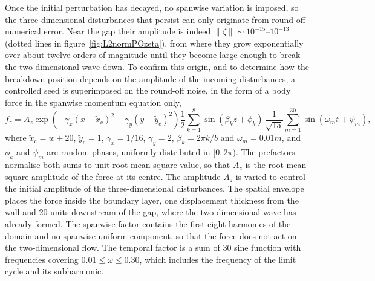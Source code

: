 \documentclass[lineno]{jfm}
\begin{document}
Once the initial perturbation has decayed, no spanwise variation is imposed, so the three-dimensional disturbances that persist can only originate from round-off numerical error. Near the gap their amplitude is indeed $\|\zeta\|\sim10^{-15}$--$10^{-13}$ (dotted lines in figure~\ref{fig:L2normPOzeta}), from where they grow exponentially over about twelve orders of magnitude until they become large enough to break the two-dimensional wave down. To confirm this origin, and to determine how the breakdown position depends on the amplitude of the incoming disturbances, a controlled seed is superimposed on the round-off noise, in the form of a body force in the spanwise momentum equation only,
\begin{equation}\label{eq:seedForcing}
	f_z = A_z\exp{\left(-\gamma_x{(x-\tilde{x}_\mathrm{c})}^2-\gamma_y{(y-\tilde{y}_\mathrm{c})}^2\right)}\frac{1}{2}\sum_{k=1}^{8}\sin(\beta_k z+\phi_k)\,\frac{1}{\sqrt{15}}\sum_{m=1}^{30}\sin(\omega_m t+\psi_m),
\end{equation}
where $\tilde{x}_\mathrm{c}=w+20$, $\tilde{y}_\mathrm{c}=1$, $\gamma_x=1/16$, $\gamma_y=2$, $\beta_k=2\pi k/b$ and $\omega_m=0.01m$, and $\phi_k$ and $\psi_m$ are random phases, uniformly distributed in $[0,2\pi)$. The prefactors normalise both sums to unit root-mean-square value, so that $A_z$ is the root-mean-square amplitude of the force at its centre. The amplitude $A_z$ is varied to control the initial amplitude of the three-dimensional disturbances. The spatial envelope places the force inside the boundary layer, one displacement thickness from the wall and $20$ units downstream of the gap, where the two-dimensional wave has already formed. The spanwise factor contains the first eight harmonics of the domain and no spanwise-uniform component, so that the force does not act on the two-dimensional flow. The temporal factor is a sum of $30$ sine function with frequencies covering $0.01\leq\omega\leq0.30$, which includes the frequency of the limit cycle and its subharmonic.
\end{document}
